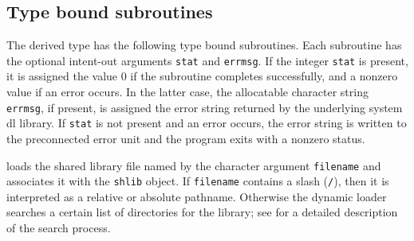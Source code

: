 \documentclass[11pt]{article}
\begin{document}
\subsection{Type bound subroutines}
The derived type has the following type bound subroutines.
Each subroutine has the optional intent-out arguments \texttt{stat} and
\texttt{errmsg}.  If the integer \texttt{stat} is present, it is assigned
the value 0 if the subroutine completes successfully, and a nonzero value
if an error occurs.  In the latter case, the allocatable character string
\texttt{errmsg}, if present, is assigned the error string returned by the
underlying system dl library.  If \texttt{stat} is not present and an error
occurs, the error string is written to the preconnected error unit and the
program exits with a nonzero status.
\begin{description}[style=nextline]\setlength{\itemsep}{0pt}
\item[\texttt{open(filename, mode [,stat [,errmsg]])}]
  loads the shared library file named by the character argument
  \texttt{filename} and associates it with the \texttt{shlib} object.
  If \texttt{filename} contains a slash (\texttt{/}), then it is interpreted
  as a relative or absolute pathname.  Otherwise the dynamic loader searches
  a certain list of directories for the library; see  for a
  detailed description of the search process.
  

\end{description}
\end{document}
